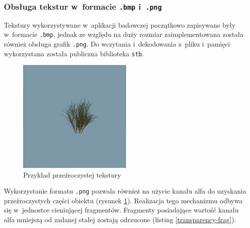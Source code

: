 \documentclass[a4paper,twoside,12pt]{book}
\begin{document}
\subsubsection{Obsługa tekstur w~formacie \texttt{.bmp} i~\texttt{.png}}
Tekstury wykorzystywane w~aplikacji badawczej początkowo zapisywane były w~formacie \texttt{.bmp}, jednak ze względu na duży rozmiar zaimplementowana została również obsługa grafik \texttt{.png}. Do wczytania i~dekodowania z~pliku i~pamięci wykorzystana została publiczna biblioteka \texttt{stb}. \\

\begin{figure}[H]
    \centering
    \includegraphics[width=0.5\textwidth]{res/transparency_example.png}
    \caption{Przykład przeźroczystej tekstury}
    \label{fig:transparency_example}
\end{figure}

Wykorzystanie formatu \texttt{.png} pozwala również na użycie kanału alfa do uzyskania przeźroczystych części obiektu (rysunek \ref{fig:transparency_example}). Realizacja tego mechanizmu odbywa się w~jednostce cieniującej fragmentów. Fragmenty posiadające wartość kanału alfa mniejszą od zadanej stałej zostają odrzucone (listing \ref{transparency-frag}).


\end{document}
